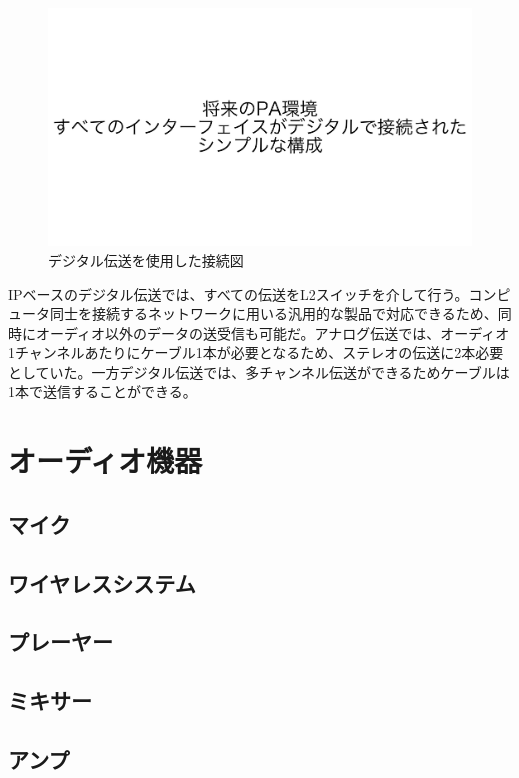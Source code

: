 \begin{figure}[htbp]
  \centering
  \label{fig:pa_equipment_digital}
  \includegraphics[width=0.8\linewidth]{img/pa_equipment_digital.pdf}
  \caption{デジタル伝送を使用した接続図}
\end{figure}

IPベースのデジタル伝送では、すべての伝送をL2スイッチを介して行う。コンピュータ同士を接続するネットワークに用いる汎用的な製品で対応できるため、同時にオーディオ以外のデータの送受信も可能だ。アナログ伝送では、オーディオ1チャンネルあたりにケーブル1本が必要となるため、ステレオの伝送に2本必要としていた。一方デジタル伝送では、多チャンネル伝送ができるためケーブルは1本で送信することができる。

\section{オーディオ機器}

\subsection{マイク}

\subsection{ワイヤレスシステム}

\subsection{プレーヤー}

\subsection{ミキサー}

\subsection{アンプ}

